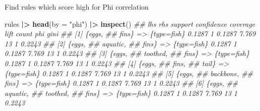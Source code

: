 \documentclass[
  notitlepage]{book}
\newenvironment{Shaded}{\begin{snugshade}}{\end{snugshade}}
\newcommand{\CommentTok}[1]{\textcolor[rgb]{0.56,0.35,0.01}{\textit{#1}}}
\newcommand{\DataTypeTok}[1]{\textcolor[rgb]{0.13,0.29,0.53}{#1}}
\newcommand{\ErrorTok}[1]{\textcolor[rgb]{0.64,0.00,0.00}{\textbf{#1}}}
\newcommand{\KeywordTok}[1]{\textcolor[rgb]{0.13,0.29,0.53}{\textbf{#1}}}
\newcommand{\NormalTok}[1]{#1}
\newcommand{\OperatorTok}[1]{\textcolor[rgb]{0.81,0.36,0.00}{\textbf{#1}}}
\newcommand{\StringTok}[1]{\textcolor[rgb]{0.31,0.60,0.02}{#1}}
\begin{document}
Find rules which score high for Phi correlation

\begin{Shaded}
\begin{Highlighting}[]
\NormalTok{rules }\OperatorTok{|}\ErrorTok{\textgreater{}}\StringTok{ }\KeywordTok{head}\NormalTok{(}\DataTypeTok{by =} \StringTok{"phi"}\NormalTok{) }\OperatorTok{|}\ErrorTok{\textgreater{}}\StringTok{ }\KeywordTok{inspect}\NormalTok{()}
\CommentTok{\#\#     lhs            rhs         support confidence coverage  lift count phi   gini}
\CommentTok{\#\# [1] \{eggs,                                                                       }
\CommentTok{\#\#      fins\}      =\textgreater{} \{type=fish\}  0.1287          1   0.1287 7.769    13   1 0.2243}
\CommentTok{\#\# [2] \{eggs,                                                                       }
\CommentTok{\#\#      aquatic,                                                                    }
\CommentTok{\#\#      fins\}      =\textgreater{} \{type=fish\}  0.1287          1   0.1287 7.769    13   1 0.2243}
\CommentTok{\#\# [3] \{eggs,                                                                       }
\CommentTok{\#\#      toothed,                                                                    }
\CommentTok{\#\#      fins\}      =\textgreater{} \{type=fish\}  0.1287          1   0.1287 7.769    13   1 0.2243}
\CommentTok{\#\# [4] \{eggs,                                                                       }
\CommentTok{\#\#      fins,                                                                       }
\CommentTok{\#\#      tail\}      =\textgreater{} \{type=fish\}  0.1287          1   0.1287 7.769    13   1 0.2243}
\CommentTok{\#\# [5] \{eggs,                                                                       }
\CommentTok{\#\#      backbone,                                                                   }
\CommentTok{\#\#      fins\}      =\textgreater{} \{type=fish\}  0.1287          1   0.1287 7.769    13   1 0.2243}
\CommentTok{\#\# [6] \{eggs,                                                                       }
\CommentTok{\#\#      aquatic,                                                                    }
\CommentTok{\#\#      toothed,                                                                    }
\CommentTok{\#\#      fins\}      =\textgreater{} \{type=fish\}  0.1287          1   0.1287 7.769    13   1 0.2243}
\end{Highlighting}
\end{Shaded}
\end{document}
